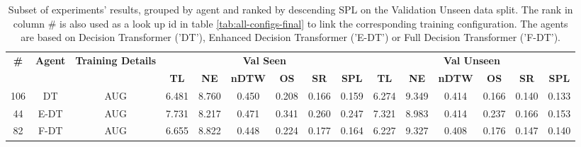 \begin{table}
\centering
\caption{\label{tab:env_drop}Subset of experiments' results, grouped by agent and ranked by descending SPL on the Validation Unseen data split. The rank in column \# is also used as a look up id in table \ref{tab:all-configs-final} to link the corresponding training configuration.     \newline The agents are based on Decision Transformer ('DT'), Enhanced Decision Transformer ('E-DT') or Full Decision Transformer ('F-DT').}
\begin{tabular}{@{\hskip3pt}c@{\hskip3pt}c@{\hskip3pt}c@{\hskip3pt}c@{\hskip3pt}c@{\hskip3pt}c@{\hskip3pt}c@{\hskip3pt}c@{\hskip3pt}c@{\hskip3pt}c@{\hskip3pt}c@{\hskip3pt}c@{\hskip3pt}c@{\hskip3pt}c@{\hskip3pt}c}
\toprule
\textbf{\#} & \textbf{Agent} & \textbf{Training Details} & \multicolumn{6}{c}{\textbf{Val Seen}} & \multicolumn{6}{c}{\textbf{Val Unseen}} \\
\cmidrule(l){4-9} \cmidrule(l){10-15} \textbf{~} &     \textbf{~} &                \textbf{~} &       \textbf{TL} & \textbf{NE} & \textbf{nDTW} & \textbf{OS} & \textbf{SR} & \textbf{SPL} &         \textbf{TL} & \textbf{NE} & \textbf{nDTW} & \textbf{OS} & \textbf{SR} & \textbf{SPL} \\
\midrule
        106 &             DT &                       AUG &             6.481 &       8.760 &         0.450 &       0.208 &       0.166 &        0.159 &               6.274 &       9.349 &         0.414 &       0.166 &       0.140 &        0.133 \\
         44 &           E-DT &                       AUG &             7.731 &       8.217 &         0.471 &       0.341 &       0.260 &        0.247 &               7.321 &       8.983 &         0.414 &       0.237 &       0.166 &        0.153 \\
         82 &           F-DT &                       AUG &             6.655 &       8.822 &         0.448 &       0.224 &       0.177 &        0.164 &               6.227 &       9.327 &         0.408 &       0.176 &       0.147 &        0.140 \\
\bottomrule
\end{tabular}
\end{table}
